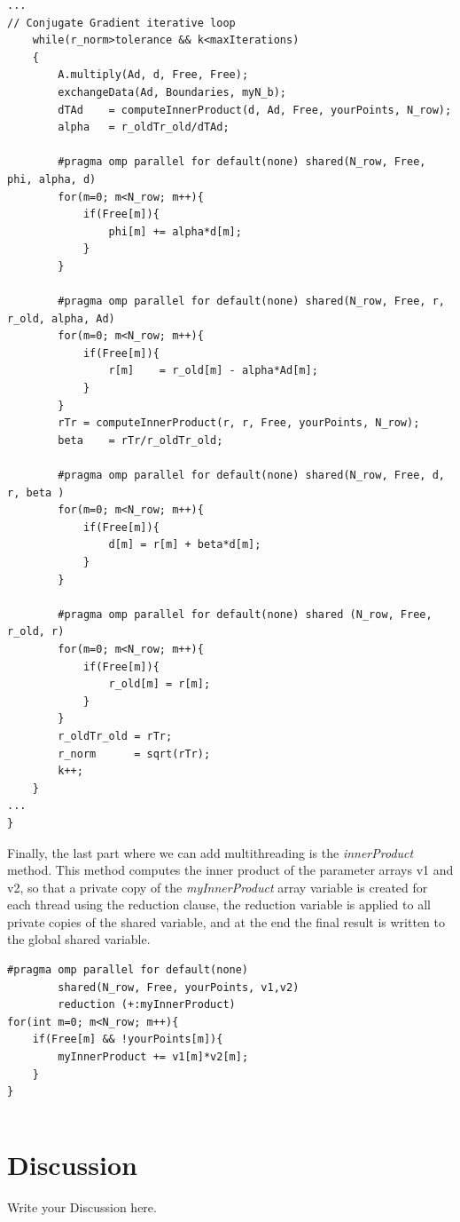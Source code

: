 \documentclass[12pt]{article}
\begin{document}
\begin{lstlisting}[style=MyC++Style]
...
// Conjugate Gradient iterative loop
    while(r_norm>tolerance && k<maxIterations)
    {
    	A.multiply(Ad, d, Free, Free);
		exchangeData(Ad, Boundaries, myN_b);
		dTAd	= computeInnerProduct(d, Ad, Free, yourPoints, N_row);
		alpha  	= r_oldTr_old/dTAd;
        
		#pragma omp parallel for default(none) shared(N_row, Free, phi, alpha, d)
		for(m=0; m<N_row; m++){
			if(Free[m]){
				phi[m] += alpha*d[m];
			}
		}
        
		#pragma omp parallel for default(none) shared(N_row, Free, r, r_old, alpha, Ad)
		for(m=0; m<N_row; m++){
			if(Free[m]){
				r[m]	= r_old[m] - alpha*Ad[m];
			}
		}
		rTr	= computeInnerProduct(r, r, Free, yourPoints, N_row);
		beta  	= rTr/r_oldTr_old;
        
		#pragma omp parallel for default(none) shared(N_row, Free, d, r, beta )
		for(m=0; m<N_row; m++){
			if(Free[m]){
				d[m] = r[m] + beta*d[m];
			}
		}
        
		#pragma omp parallel for default(none) shared (N_row, Free, r_old, r)
		for(m=0; m<N_row; m++){
			if(Free[m]){
				r_old[m] = r[m];
			}
		}
		r_oldTr_old	= rTr;
		r_norm		= sqrt(rTr);
		k++;
	}
...
}
\end{lstlisting}

Finally, the last part where we can add multithreading is the \textit{innerProduct} method. This method computes the inner product of the parameter arrays v1 and v2, so that a private copy of the \textit{myInnerProduct} array variable is created for each thread using the reduction clause, the reduction variable is applied to all private copies of the shared variable, and at the end the final result is written to the global shared variable.

\begin{lstlisting}[style=MyC++Style]
#pragma omp parallel for default(none) 
		shared(N_row, Free, yourPoints, v1,v2) 
		reduction (+:myInnerProduct)
for(int m=0; m<N_row; m++){
	if(Free[m] && !yourPoints[m]){
		myInnerProduct += v1[m]*v2[m];
	}
}
\end{lstlisting}

\begin{lstlisting}[style=MyC++Style]

\end{lstlisting}
	
	\section{Discussion}
	Write your Discussion here.	
	
\end{document}
